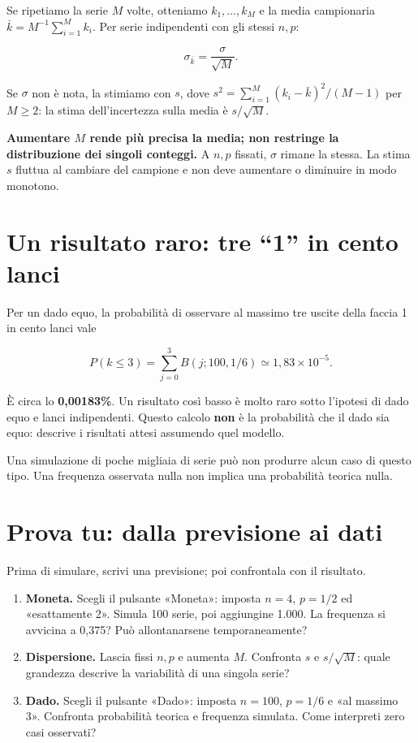 \documentclass[
  italian,
  letterpaper,
  DIV=11,
  numbers=noendperiod]{scrreprt}
\providecommand{\tightlist}{%
  \setlength{\itemsep}{0pt}\setlength{\parskip}{0pt}}
\begin{document}
Se ripetiamo la serie \(M\) volte, otteniamo \(k_1,\ldots,k_M\) e la
media campionaria \(\bar{k}=M^{-1}\sum_{i=1}^M k_i\). Per serie
indipendenti con gli stessi \(n,p\):

\[
\sigma_{\bar{k}}=\frac{\sigma}{\sqrt M}.
\]

Se \(\sigma\) non è nota, la stimiamo con \(s\), dove
\(s^2=\sum_{i=1}^M(k_i-\bar{k})^2/(M-1)\) per \(M\geq2\): la stima
dell'incertezza sulla media è \(s/\sqrt M\).

\textbf{Aumentare \(M\) rende più precisa la media; non restringe la
distribuzione dei singoli conteggi.} A \(n,p\) fissati, \(\sigma\)
rimane la stessa. La stima \(s\) fluttua al cambiare del campione e non
deve aumentare o diminuire in modo monotono.

\section{Un risultato raro: tre ``1'' in cento
lanci}\label{un-risultato-raro-tre-1-in-cento-lanci}

Per un dado equo, la probabilità di osservare al massimo tre uscite
della faccia 1 in cento lanci vale

\[
P(k\leq3)=\sum_{j=0}^{3}B(j;100,1/6)
\simeq1{,}83\times10^{-5}.
\]

È circa lo \textbf{0,00183\%}. Un risultato così basso è molto raro
sotto l'ipotesi di dado equo e lanci indipendenti. Questo calcolo
\textbf{non} è la probabilità che il dado sia equo: descrive i risultati
attesi assumendo quel modello.

Una simulazione di poche migliaia di serie può non produrre alcun caso
di questo tipo. Una frequenza osservata nulla non implica una
probabilità teorica nulla.

\section{Prova tu: dalla previsione ai dati}\label{sec-attivita}

Prima di simulare, scrivi una previsione; poi confrontala con il
risultato.

\begin{enumerate}
\def\labelenumi{\arabic{enumi}.}
\tightlist
\item
  \textbf{Moneta.} Scegli il pulsante «Moneta»: imposta \(n=4\),
  \(p=1/2\) ed «esattamente 2». Simula 100 serie, poi aggiungine 1.000.
  La frequenza si avvicina a 0,375? Può allontanarsene temporaneamente?
\item
  \textbf{Dispersione.} Lascia fissi \(n,p\) e aumenta \(M\). Confronta
  \(s\) e \(s/\sqrt M\): quale grandezza descrive la variabilità di una
  singola serie?
\item
  \textbf{Dado.} Scegli il pulsante «Dado»: imposta \(n=100\), \(p=1/6\)
  e «al massimo 3». Confronta probabilità teorica e frequenza simulata.
  Come interpreti zero casi osservati?
\end{enumerate}
\end{document}
